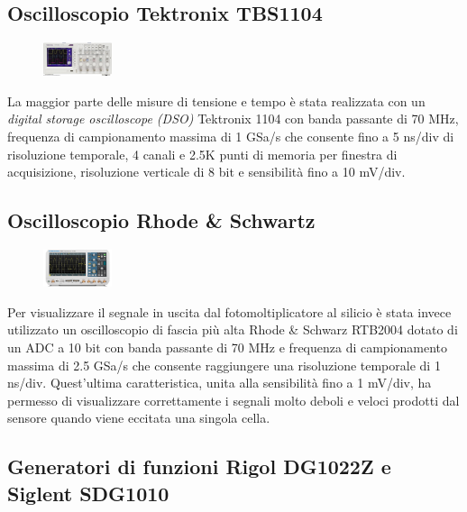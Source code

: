 \documentclass[journal]{IEEEtran}
\begin{document}
\subsection{\textbf{Oscilloscopio Tektronix TBS1104}}

\begin{figure}[h!]
  \centering
  \includegraphics[width=0.18\textwidth]{lab-reports/Schematics-and-graphics/TEK Osc.png}
\end{figure}

La maggior parte delle misure di tensione e tempo è stata realizzata con un \textit{digital storage oscilloscope (DSO)} Tektronix 1104 con banda passante di 70 MHz, frequenza di campionamento massima di 1 GSa/s che consente fino a 5 ns/div di risoluzione temporale, 4 canali e 2.5K punti di memoria per finestra di acquisizione, risoluzione verticale di 8 bit e sensibilità fino a 10 mV/div. \cite{A}

\subsection{\textbf{Oscilloscopio Rhode \& Schwartz}}

\begin{figure}[h!]
  \centering
  \includegraphics[width=0.18\textwidth]{lab-reports/Schematics-and-graphics/RS Osc.png}
\end{figure}

Per visualizzare il segnale in uscita dal fotomoltiplicatore al silicio è stata invece utilizzato un oscilloscopio di fascia più alta Rhode & Schwarz RTB2004 dotato di un ADC a 10 bit con banda passante di 70 MHz e frequenza di campionamento massima di 2.5 GSa/s che consente raggiungere una risoluzione temporale di 1 ns/div. Quest'ultima caratteristica, unita alla sensibilità fino a 1 mV/div, ha permesso di visualizzare correttamente i segnali molto deboli e veloci prodotti dal sensore quando viene eccitata una singola cella. \cite{B}

\subsection{\textbf{Generatori di funzioni Rigol DG1022Z e Siglent SDG1010}}
\end{document}
